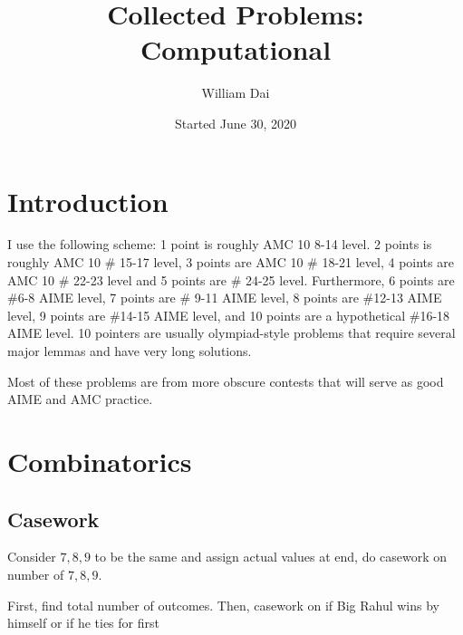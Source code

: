\documentclass[11pt]{article}
\title{Collected Problems: Computational}
\author{William Dai}
\date{Started June 30, 2020}
\begin{document}
\maketitle

\section{Introduction}
I use the following scheme: 1 point is roughly AMC 10 8-14 level. 2 points is roughly AMC 10 \# 15-17 level, 3 points are AMC 10 \# 18-21 level, 4 points are AMC 10 \# 22-23 level and 5 points are \# 24-25 level. Furthermore, 6 points are \#6-8 AIME level, 7 points are \# 9-11 AIME level,   8 points are \#12-13 AIME level, 9 points are \#14-15 AIME level, and 10 points are a hypothetical \#16-18 AIME level. 10 pointers are usually olympiad-style problems that require several major lemmas and have very long solutions.

Most of these problems are from more obscure contests that will serve as good AIME and AMC practice. 
\section{Combinatorics}
\subsection{Casework}

\begin{sol}
Consider $7,8,9$ to be the same and assign actual values at end, do casework on number of $7,8,9$.
\end{sol}


\begin{sol} 
First, find total number of outcomes. Then, casework on if Big Rahul wins by himself or if he ties for first
\end{sol}
\end{document}
